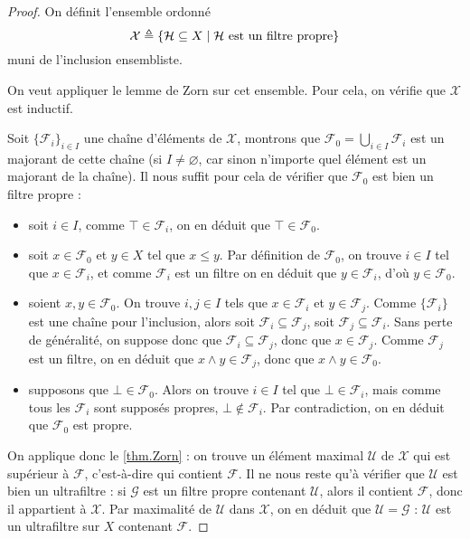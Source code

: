 \begin{proof}
  On définit l'ensemble ordonné
  \[\mathcal X \triangleq \{\mathcal H \subseteq X\mid \mathcal H
  \text{ est un filtre propre}\}\]
  muni de l'inclusion ensembliste.

  On veut appliquer le lemme de Zorn sur cet ensemble. Pour cela, on vérifie
  que $\mathcal X$ est inductif.

  Soit $\{\mathcal F_i\}_{i\in I}$ une chaîne d'éléments de $\mathcal X$,
  montrons que $\mathcal F_0 = \displaystyle\bigcup_{i\in I} \mathcal F_i$ est un
  majorant de cette chaîne (si $I \neq \varnothing$, car sinon n'importe quel
  élément est un majorant de la chaîne). Il nous suffit pour cela de vérifier
  que $\mathcal F_0$ est bien un filtre propre :
  \begin{itemize}
  \item soit $i\in I$, comme $\top \in \mathcal F_i$, on en déduit que
    $\top \in \mathcal F_0$.
  \item soit $x\in \mathcal F_0$ et $y\in X$ tel que $x\leq y$. Par définition
    de $\mathcal F_0$, on trouve $i\in I$ tel que $x\in \mathcal F_i$, et comme
    $\mathcal F_i$ est un filtre on en déduit que $y\in \mathcal F_i$, d'où
    $y\in\mathcal F_0$.
  \item soient $x,y\in \mathcal F_0$. On trouve $i,j\in I$ tels que
    $x\in \mathcal F_i$ et $y\in \mathcal F_j$. Comme $\{\mathcal F_i\}$ est une
    chaîne pour l'inclusion, alors soit $\mathcal F_i \subseteq \mathcal F_j$,
    soit $\mathcal F_j\subseteq \mathcal F_i$. Sans perte de généralité, on
    suppose donc que $\mathcal F_i\subseteq \mathcal F_j$, donc que
    $x\in \mathcal F_j$. Comme $\mathcal F_j$ est un filtre, on en déduit que
    $x\land y \in \mathcal F_j$, donc que $x\land y \in \mathcal F_0$.
  \item supposons que $\bot\in \mathcal F_0$. Alors on trouve $i\in I$ tel que
    $\bot\in \mathcal F_i$, mais comme tous les $\mathcal F_i$ sont supposés
    propres, $\bot\notin\mathcal F_i$. Par contradiction, on en déduit que
    $\mathcal F_0$ est propre.
  \end{itemize}

  On applique donc le \cref{thm.Zorn} : on trouve un élément maximal
  $\mathcal U$ de $\mathcal X$ qui est supérieur à $\mathcal F$, c'est-à-dire
  qui contient $\mathcal F$. Il ne nous reste qu'à vérifier que $\mathcal U$ est
  bien un ultrafiltre : si $\mathcal G$ est un filtre propre contenant
  $\mathcal U$, alors il contient $\mathcal F$, donc il appartient à
  $\mathcal X$. Par maximalité de $\mathcal U$ dans $\mathcal X$, on en déduit
  que $\mathcal U = \mathcal G$ : $\mathcal U$ est un ultrafiltre sur $X$
  contenant $\mathcal F$.
\end{proof}


